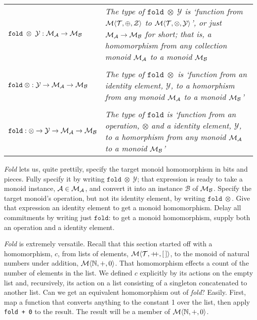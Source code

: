 \begin{center}
\begin{tabular}{ll}
  $\mathtt{fold}\;\otimes\;\mathcal{Y}:
    \mathcal{M}_{\mathcal{A}}\rightarrow\mathcal{M}_{\mathcal{B}}$
    & \parbox{2.85in}{\footnotesize\emph{The
      type of $\mathtt{fold}\;\otimes\;\mathcal{Y}$
      is `function from $\mathcal{M}\langle{\mathcal{T}},{\oplus},{\mathcal{Z}}\rangle$ to
      $\mathcal{M}\langle{\mathcal{T}},{\otimes},{\mathcal{Y}}\rangle$', or just $\mathcal{M}_{\mathcal{A}}\rightarrow
      \mathcal{M}_{\mathcal{B}}$ for short; that is, a homomorphism from
      any collection monoid $\mathcal{M}_{\mathcal{A}}$
      to a monoid $\mathcal{M}_{\mathcal{B}}$}} \\
  {}&{}\\
  $\mathtt{fold}\;\otimes:\mathcal{Y}\rightarrow
    \mathcal{M}_{\mathcal{A}}\rightarrow\mathcal{M}_{\mathcal{B}}$
    & \parbox{2.85in}{\footnotesize\emph{The
      type of $\mathtt{fold}\;\otimes$
      is `function from an identity element, $\mathcal{Y}$, to a
      homorphism from any monoid $\mathcal{M}_{\mathcal{A}}$
      to a monoid $\mathcal{M}_{\mathcal{B}}$'}}\\
  {}&{}\\
  $\mathtt{fold}:\otimes\rightarrow\mathcal{Y}\rightarrow
    \mathcal{M}_{\mathcal{A}}\rightarrow\mathcal{M}_{\mathcal{B}}$
    & \parbox{2.85in}{\footnotesize\emph{The
      type of $\mathtt{fold}$
      is `function from an operation, $\otimes$ and a
      identity element, $\mathcal{Y}$, to a
      homorphism from any monoid $\mathcal{M}_{\mathcal{A}}$
      to a monoid $\mathcal{M}_{\mathcal{B}}$'}}\\
  \end{tabular}
\end{center}


\emph{Fold} lets us, quite prettily, specify the target monoid homomorphism in bits and pieces. Fully specify it by writing $\mathtt{fold}\;\otimes\;\mathcal{Y}$; that expression is ready to take a monoid instance, $\mathcal{A}\in\mathcal{M}_{\mathcal{A}}$, and convert it into an instance $\mathcal{B}$ of $\mathcal{M}_{\mathcal{B}}$. Specify the target monoid's operation, but not its identity element, by writing $\mathtt{fold}\;\otimes$. Give that expression an identity element to get a monoid homomorphism. Delay all commitments by writing just $\mathtt{fold}$: to get a monoid homomorphism, supply both an operation and a identity element.


\emph{Fold} is extremely versatile. Recall that this section started off with a homomorphism, $c$, from lists of elements, $\Mon{\T}{\pp}{\emptylist}$, to the monoid of natural numbers under addition, $\mathcal{M}\langle{\mathbb{N}},{+},{0}\rangle$. That homomorphism effects a count of the number of elements in the list. We defined $c$ explicitly by its actions on the empty list and, recursively, its action on a list consisting of a singleton concatenated to another list. Can we get an equivalent homomorphism out of \emph{fold}? Easily. First, map a function that converts anything to the constant 1 over the list, then apply \verb"fold + 0" to the result. The result will be a member of $\mathcal{M}\langle{\mathbb{N}},{+},{0}\rangle$.


